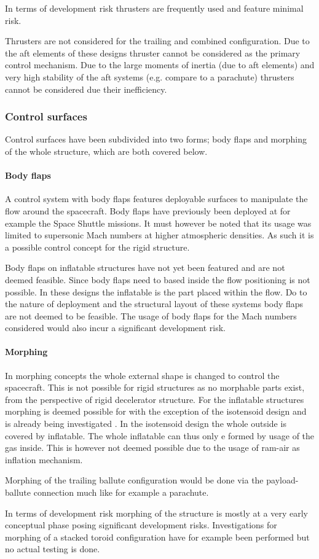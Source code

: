 In terms of development risk thrusters are frequently used and feature minimal risk.

Thrusters are not considered for the trailing and combined configuration. Due to the aft elements of these designs thruster cannot be considered as the primary control mechanism. Due to the large moments of inertia (due to aft elements) and very high stability of the aft systems (e.g. compare to a parachute) thrusters cannot be considered due their inefficiency. 

\subsubsection{Control surfaces}
Control surfaces have been subdivided into two forms; body flaps and morphing of the whole structure, which are both covered below.

\paragraph{Body flaps}
A control system with body flaps features deployable surfaces to manipulate the flow around the spacecraft. Body flaps have previously been deployed at for example the Space Shuttle missions. It must however be noted that its usage was limited to supersonic Mach numbers at higher atmospheric densities. As such it is a possible control concept for the rigid structure.

Body flaps on inflatable structures have not yet been featured and are not deemed feasible. Since body flaps need to based inside the flow positioning is not possible. In these designs the inflatable is the part placed within the flow. Do to the nature of deployment and the structural layout of these systems body flaps are not deemed to be feasible. The usage of body flaps for the Mach numbers considered would also incur a significant development risk.

\paragraph{Morphing}
In morphing concepts the whole external shape is changed to control the spacecraft. This is not possible for rigid structures as no morphable parts exist, from the perspective of rigid decelerator structure. 
 For the inflatable structures morphing is deemed possible for with the exception of the isotensoid design and is already being investigated \cite{Hughes2011}. In the isotensoid design the whole outside is covered by inflatable. The whole inflatable can thus only e formed by usage of the gas inside. This is however not deemed possible due to the usage of ram-air as inflation mechanism.

Morphing of the trailing ballute configuration would be done via the payload-ballute connection much like for example a parachute.

In terms of development risk morphing of the structure is mostly at a very early conceptual phase posing significant development risks. Investigations for morphing of a stacked toroid configuration have for example been performed \cite{Green2013} but no actual testing is done.
